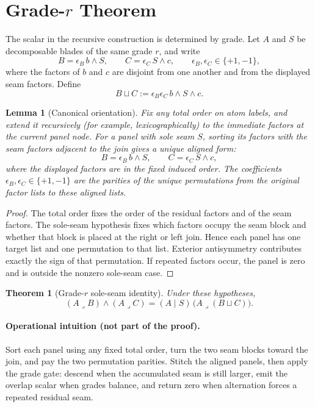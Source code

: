 \documentclass[11pt]{article}
\newtheorem{theorem}{Theorem}
\newtheorem{lemma}{Lemma}
\begin{document}
\section{Grade-\(r\) Theorem}

The scalar in the recursive construction is determined by grade. Let \(A\)
and \(S\) be decomposable blades of the same grade \(r\), and write
\[
  B=\epsilon_B\,b\wedge S,\qquad
  C=\epsilon_C\,S\wedge c,
  \qquad \epsilon_B,\epsilon_C\in\{+1,-1\},
\]
where the factors of \(b\) and \(c\) are disjoint from one another and from
the displayed seam factors. Define
\[
  B\sqcup C :=
  \epsilon_B\epsilon_C\,b\wedge S\wedge c .
\]

\begin{lemma}[Canonical orientation]
\label{lem:canonical-orientation}
Fix any total order on atom labels, and extend it recursively (for example,
lexicographically) to the immediate factors at the current panel node. For a
panel with sole seam \(S\), sorting its factors
with the seam factors adjacent to the join gives a unique aligned form:
\[
 B=\epsilon_B\,b\wedge S,\qquad
 C=\epsilon_C\,S\wedge c,
\]
where the displayed factors are in the fixed induced order. The coefficients
\(\epsilon_B,\epsilon_C\in\{+1,-1\}\) are the parities of the unique
permutations from the original factor lists to these aligned lists.
\end{lemma}

\begin{proof}
The total order fixes the order of the residual factors and of the seam
factors. The sole-seam hypothesis fixes which factors occupy the seam block
and whether that block is placed at the right or left join. Hence each panel
has one target list and one permutation to that list. Exterior antisymmetry
contributes exactly the sign of that permutation. If repeated factors occur,
the panel is zero and is outside the nonzero sole-seam case.
\end{proof}

\begin{theorem}[Grade-\(r\) sole-seam identity]
\label{thm:grade-r-seam}
Under these hypotheses,
\[
  (A\mathbin{\lrcorner}B)\wedge(A\mathbin{\lrcorner}C)
  =
  (A\mid S)\,
  \bigl(A\mathbin{\lrcorner}(B\sqcup C)\bigr).
\]
\end{theorem}

\paragraph{Operational intuition (not part of the proof).}
Sort each panel using any fixed total order, turn the two seam blocks toward
the join, and pay the two permutation parities. Stitch the aligned panels,
then apply the grade gate: descend when the accumulated seam is still larger,
emit the overlap scalar when grades balance, and return zero when alternation
forces a repeated residual seam.
\end{document}
